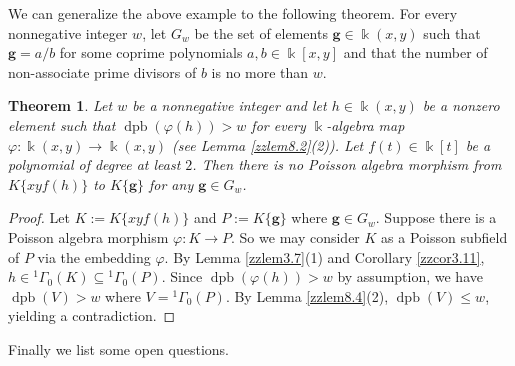 \documentclass[12pt]{amsart}
\theoremstyle{plain}
\newtheorem{theorem}{Theorem}
\numberwithin{theorem}{section}
\numberwithin{equation}{theorem}
\theoremstyle{definition}
\DeclareMathOperator{\dpb}{dpb}
\newcommand \bfg {{\mathbf{g}}}
\begin{document}
We can generalize the above example to the following theorem.
For every nonnegative integer $w$, 
let $G_{w}$ be the set of elements $\bfg \in \Bbbk(x,y)$ such that 
$\bfg =a/b$ for some coprime polynomials $a,b \in \Bbbk[x,y]$ and that the number of non-associate prime divisors of $b$ is no more than $w$.


\begin{theorem}
\label{zzthm8.6}
Let $w$ be a nonnegative integer and let 
$h\in \Bbbk(x,y)$ be a nonzero element such that 
$\dpb(\varphi(h))>w$ for every $\Bbbk$-algebra map 
$\varphi: \Bbbk(x,y) \to \Bbbk(x,y)$ {\rm{(}}see Lemma \ref{zzlem8.2}(2){\rm{)}}. 
Let $f(t) \in \Bbbk[t]$ be a 
polynomial of degree at least $2$. Then there is no Poisson 
algebra morphism from $K\{xyf(h)\}$ to $K\{\bfg\}$ for any $\bfg\in G_w$.
\end{theorem}

\begin{proof}
Let $K :=K\{xyf(h)\}$ and $P:=K\{\bfg\}$ where $\bfg\in G_w$. Suppose there is a 
Poisson algebra morphism $\varphi: K\to P$. So we may 
consider $K$ as a Poisson subfield of $P$ via the embedding 
$\varphi$. By Lemma \ref{zzlem3.7}(1) and Corollary 
\ref{zzcor3.11}, 
$h\in {^1\Gamma}_{0}(K) \subseteq {^1\Gamma}_{0}(P)$. 
Since $\dpb(\varphi(h))> w$ by assumption, we have $\dpb(V)>w$ 
where $V={^1\Gamma}_{0}(P)$. By Lemma \ref{zzlem8.4}(2), 
$\dpb(V)\leq w$, yielding a contradiction.
\end{proof}


Finally we list some open questions.
\end{document}
